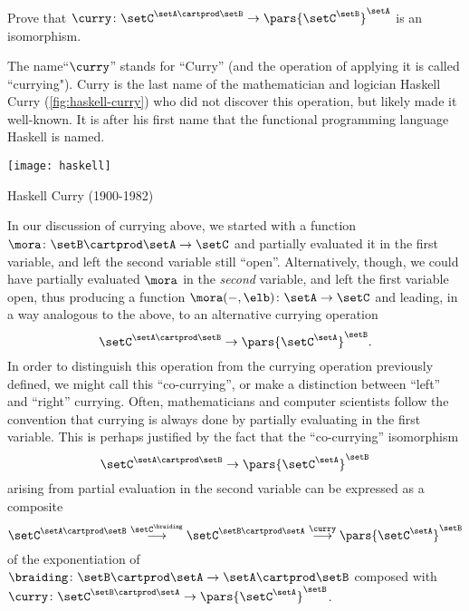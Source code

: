 \begin{exercise}\label{ex:currying-is-an-iso}
Prove that  $\curry \colon \setC^{\setA \cartprod \setB} \to \pars{\setC^\setB}^\setA$ is an isomorphism. 
\end{exercise}

\begin{solution}
\end{solution}

The name``$\curry$'' stands for ``Curry'' (and the operation of applying it is called ``currying"). Curry is the last name of the mathematician and logician Haskell Curry (\cref{fig:haskell-curry}) who did not discover this operation, but likely made it well-known. It is after his first name that the functional programming language Haskell is named. 

\begin{marginfigure}
    \texttt{[image: haskell]}
    \caption{Haskell Curry (1900-1982)}
    \label{fig:haskell-curry}
\end{marginfigure}

\begin{remark}
In our discussion of currying above, we started with a function $\mora \colon \setB \cartprod \setA \to \setC$ and partially evaluated it in the first variable, and left the second variable still ``open''. Alternatively, though, we could have partially evaluated $\mora$ in the \emph{second} variable, and left the first variable open, thus producing a function $\mora(-, \elb) \colon \setA \to \setC$ and leading, in a way analogous to the above, to an alternative currying operation 
\begin{equation}
\setC^{\setA \cartprod \setB} \to \pars{\setC^\setA}^\setB.
\end{equation}
In order to distinguish this operation from the currying operation previously defined, we might call this ``co-currying'', or make a distinction between ``left'' and ``right'' currying. Often, mathematicians and computer scientists follow the convention that currying is always done by partially evaluating in the first variable. This is perhaps justified by the fact that the ``co-currying'' isomorphism
\begin{equation}
\setC^{\setA \cartprod \setB} \to \pars{\setC^\setA}^\setB
\end{equation}
arising from partial evaluation in the second variable can be expressed as a composite
\begin{equation}
\setC^{\setA \cartprod \setB} \overset{{\setC^{\braiding}}}{\longrightarrow} \setC^{\setB \cartprod \setA} \overset{\curry}{\longrightarrow} \pars{\setC^\setA}^\setB
\end{equation}
of the exponentiation of $\braiding \colon \setB \cartprod \setA \to \setA \cartprod \setB$ composed with $\curry \colon \setC^{\setB \cartprod \setA} \to \pars{\setC^\setA}^\setB$.  
\end{remark}

